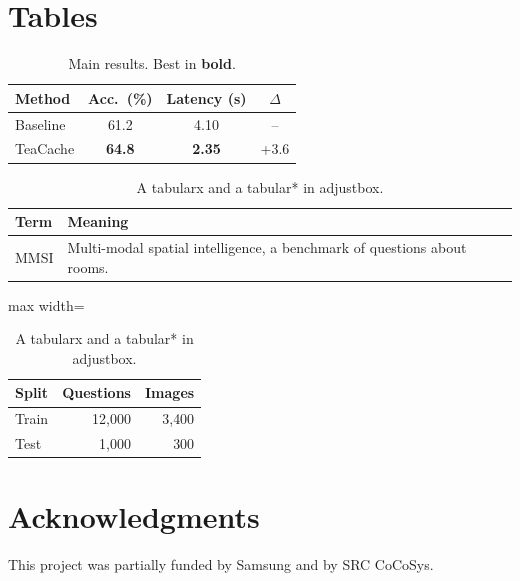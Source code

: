 \documentclass{article}
\newenvironment{ack}{\section*{Acknowledgments}}{}
\begin{document}
\section{Tables}

\begin{table}[t]
  \centering
  \caption{Main results. Best in \textbf{bold}.}
  \label{tab:main}
  \begin{tabular}{lccc}
    \toprule
    Method & Acc.\ (\%) & Latency (s) & $\Delta$ \\
    \midrule
    Baseline & 61.2 & 4.10 & -- \\
    TeaCache & \textbf{64.8} & \textbf{2.35} & +3.6 \\
    \bottomrule
  \end{tabular}
\end{table}

\begin{table}[t]
  \centering
  \caption{Per-category accuracy with grouped headers.}
  \label{tab:wide}
\end{table}

\begin{table}[t]
  \centering
  \caption{A tabularx and a tabular* in adjustbox.}
  \label{tab:x}
  \begin{tabularx}{\linewidth}{lX}
    \toprule
    Term & Meaning \\
    \midrule
    MMSI & Multi-modal spatial intelligence, a benchmark of questions about rooms. \\
    \bottomrule
  \end{tabularx}
  \vspace{4pt}
  \begin{adjustbox}{max width=\linewidth}
  \begin{tabular*}{\linewidth}{@{\extracolsep{\fill}}lrr}
    \hline
    Split & Questions & Images \\ \hline
    Train & 12{,}000 & 3{,}400 \\
    Test & 1{,}000 & 300 \\ \hline
  \end{tabular*}
  \end{adjustbox}
\end{table}

\begin{ack}
This project was partially funded by Samsung and by SRC CoCoSys.
\end{ack}




\appendix
\raggedbottom


\newpage

\end{document}
